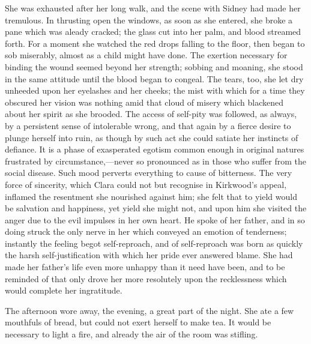 She was exhausted after her long walk, and the scene with Sidney had
made her tremulous. In thrusting open the windows, as soon as she
entered, she broke a pane which was aleady cracked; the glass cut into
her palm, and blood streamed forth. For a moment she watched the red
drops falling to the floor, then began to sob miserably, almost as a
child {\protect\hypertarget{227}{}{}}might have done. The exertion
necessary for binding the wound seemed beyond her strength; sobbing and
moaning, she stood in the same attitude until the blood began to
congeal. The tears, too, she let dry unheeded upon her eyelashes and her
cheeks; the mist with which for a time they obscured her vision was
nothing amid that cloud of misery which blackened about her spirit as
she brooded. The access of self-pity was followed, as always, by a
persistent sense of intolerable wrong, and that again by a fierce desire
to plunge herself into ruin, as though by such act she could satiate her
instincts of defiance. It is a phase of exasperated egotism common
enough in original natures frustrated by circumstance,---never so
pronounced as in those who suffer from the social disease. Such mood
perverts everything to cause of bitterness. The very force of sincerity,
which Clara could not but recognise in Kirkwood's appeal, inflamed the
resentment she nourished against him; she felt that to yield would be
salvation and happiness, yet yield she might not, and
{\protect\hypertarget{228}{}{}}upon him she visited the anger due to the
evil impulses in her own heart. He spoke of her father, and in so doing
struck the only nerve in her which conveyed an emotion of tenderness;
instantly the feeling begot self-reproach, and of self-reproach was born
as quickly the harsh self-justification with which her pride ever
answered blame. She had made her father's life even more unhappy than it
need have been, and to be reminded of that only drove her more
resolutely upon the recklessness which would complete her ingratitude.

The afternoon wore away, the evening, a great part of the night. She ate
a few mouthfuls of bread, but could not exert herself to make tea. It
would be necessary to light a fire, and already the air of the room was
stifling.

